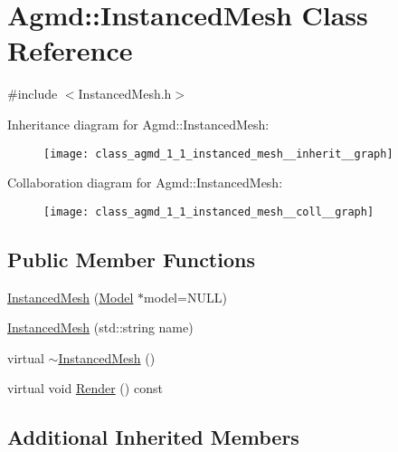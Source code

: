 \hypertarget{class_agmd_1_1_instanced_mesh}{\section{Agmd\+:\+:Instanced\+Mesh Class Reference}
\label{class_agmd_1_1_instanced_mesh}
}


{\ttfamily \#include $<$Instanced\+Mesh.\+h$>$}



Inheritance diagram for Agmd\+:\+:Instanced\+Mesh\+:\nopagebreak
\begin{figure}[H]
\begin{center}
\leavevmode
\texttt{[image: class\_agmd\_1\_1\_instanced\_mesh\_\_inherit\_\_graph]}
\end{center}
\end{figure}


Collaboration diagram for Agmd\+:\+:Instanced\+Mesh\+:\nopagebreak
\begin{figure}[H]
\begin{center}
\leavevmode
\texttt{[image: class\_agmd\_1\_1\_instanced\_mesh\_\_coll\_\_graph]}
\end{center}
\end{figure}
\subsection*{Public Member Functions}
\begin{DoxyCompactItemize}
\item 
\hyperlink{class_agmd_1_1_instanced_mesh_aad1ba467211af8f7e1c1efab1f43bd12}{Instanced\+Mesh} (\hyperlink{class_agmd_1_1_model}{Model} $\ast$model=N\+U\+L\+L)
\item 
\hyperlink{class_agmd_1_1_instanced_mesh_ae239f5e3a573e3f93a14f63bbb3b3051}{Instanced\+Mesh} (std\+::string name)
\item 
virtual \hyperlink{class_agmd_1_1_instanced_mesh_ab5c66e3223a64806098ed0351fe0bed6}{$\sim$\+Instanced\+Mesh} ()
\item 
virtual void \hyperlink{class_agmd_1_1_instanced_mesh_a653711846b5fff21a70178295779d088}{Render} () const 
\end{DoxyCompactItemize}
\subsection*{Additional Inherited Members}


